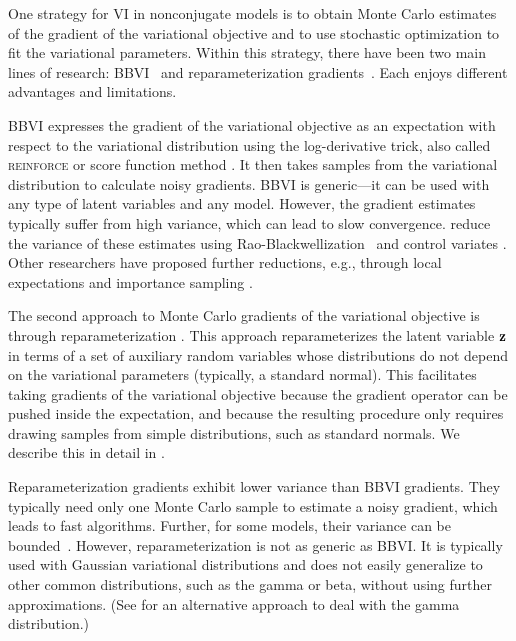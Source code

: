 One strategy for \gls{VI} in nonconjugate models is to 
obtain Monte Carlo estimates of the gradient of the variational objective
and to use stochastic optimization to fit the variational parameters.
Within this strategy, there have been two main lines of research:
\gls{BBVI}~\citep{Ranganath2014} and reparameterization
gradients~\citep{Salimans2013,Kingma2014}. Each enjoys different
advantages and limitations.

\gls{BBVI} expresses the gradient of the
variational objective as an expectation with respect to the
variational distribution using the log-derivative trick,
also called \textsc{reinforce} or score function method
\citep{Glynn1990,Williams1992}. It then takes samples from the variational
distribution to calculate noisy gradients. \gls{BBVI} is generic---it
can be used with any type of latent variables and any model. However,
the gradient estimates typically suffer from high variance, which can
lead to slow convergence. \citet{Ranganath2014} reduce the variance of
these estimates using 
Rao-Blackwellization~\citep{Casella1996} and control variates
\citep{Ross2002,Paisley2012,Gu2016}. Other researchers have proposed
further reductions, e.g., through local expectations
\citep{Titsias2015} and importance sampling \citep{Ruiz2016}.


The second approach to Monte Carlo gradients of the variational
objective is through reparameterization
\citep{Price1958,Bonnet1964,Salimans2013,Kingma2014,Rezende2014}.
This approach reparameterizes the latent variable $\mathbf{z}$ in terms of a set of
auxiliary random variables whose distributions do not depend on the
variational parameters (typically, a standard normal). This facilitates
taking gradients of the
variational objective because the gradient operator can be pushed
inside the expectation, and because the resulting procedure only
requires drawing samples from simple distributions, such as standard normals.
We describe this in detail in .

Reparameterization gradients exhibit lower variance than \gls{BBVI}
gradients. They typically need only one Monte Carlo sample to estimate
a noisy gradient, which leads to fast algorithms. Further, for some
models, their variance can be bounded~\citep{Fan2015}. However,
reparameterization is not as generic
as \gls{BBVI}. It is typically used with Gaussian variational
distributions and does not easily generalize to other common
distributions, such as the gamma or beta, without using further approximations. (See \citet{Knowles2015} for an alternative approach to deal with the gamma distribution.)

